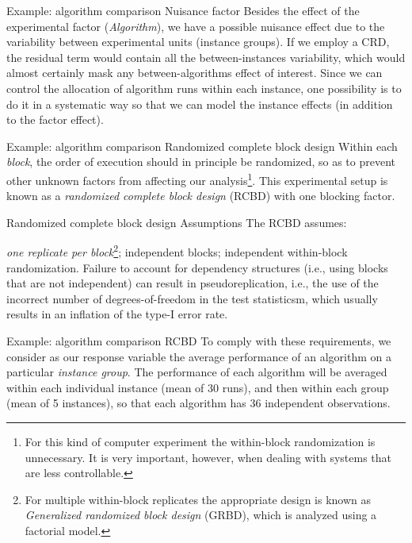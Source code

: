 \documentclass[t]{beamer}
\begin{document}

\begin{ftst}
{Example: algorithm comparison}
{Nuisance factor}
Besides the effect of the experimental factor (\textit{Algorithm}), we have a possible nuisance effect due to the variability between experimental units (instance groups).
\vone
If we employ a CRD, the residual term would contain all the between-instances variability, which would almost certainly mask any between-algorithms effect of interest.
\vone
Since we can control the allocation of algorithm runs within each instance, one possibility is to do it in a systematic way so that we can model the instance effects (in addition to the factor effect).
\end{ftst}


\begin{ftst}
{Example: algorithm comparison}
{Randomized complete block design}
Within each \textit{block}, the order of execution should in principle be randomized, so as to prevent other unknown factors from affecting our analysis\footnote[2]{\tiny For this kind of computer experiment the within-block randomization is unnecessary. It is very important, however, when dealing with systems that are less controllable.}. 
\vone
This experimental setup is known as a \textit{randomized complete block design} (RCBD) with one blocking factor.
\end{ftst}


\begin{ftst}
{Randomized complete block design}
{Assumptions}
The RCBD assumes:

\bitems \textit{one replicate per block}\footnote[3]{\tiny For multiple within-block replicates the appropriate design is known as \textit{Generalized randomized block design} (GRBD), which is analyzed using a factorial model.};
\spitem independent blocks;
\spitem independent within-block randomization. 
\eitem
\vhalf
Failure to account for dependency structures (i.e., using blocks that are not independent) can result in pseudoreplication, i.e., the use of the incorrect number of degrees-of-freedom in the test statisticsm, which usually results in an inflation of the type-I error rate.
\end{ftst}


\begin{ftst}
{Example: algorithm comparison}
{RCBD}
To comply with these requirements, we consider as our response variable the average performance of an algorithm on a particular \textit{instance group}.
\vone
The performance of each algorithm will be averaged within each individual instance (mean of 30 runs), and then within each group (mean of 5 instances), so that each algorithm has 36 independent observations.
\end{ftst}
\end{document}

